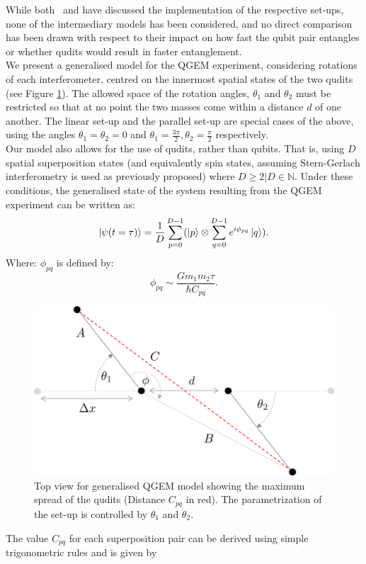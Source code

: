 \documentclass[%
 12pt,
 superscriptaddress,
 amsmath,
 amssymb,
 onecolumn,
 longbibliography
]{revtex4-2}
\begin{document}
\indent While both~\cite{Bose2017} and \cite{Nguyen2019} have discussed the implementation of the respective set-ups, none of the intermediary models has been considered, and no direct comparison has been drawn with respect to their impact on how fast the qubit pair entangles or whether qudits would result in faster entanglement. \\
\indent We present a generalised model for the QGEM experiment, considering rotations of each interferometer, centred on the innermost spatial states of the two qudits (see Figure \ref{fig:generalised set-up}). The allowed space of the rotation angles, $\theta_1$ and $\theta_2$ must be restricted so that at no point the two masses come within a distance $d$ of one another. The linear set-up and the parallel set-up are special cases of the above, using the angles $\theta_1=\theta_2=0$ and $\theta_1 = \frac{3\pi}{2}, \theta_2 = \frac{\pi}{2}$ respectively. \\
\indent Our model also allows for the use of qudits, rather than qubits. That is, using $D$ spatial superposition states (and equivalently spin states, assuming Stern-Gerlach interferometry is used as previously proposed) where $D\ge2|D\in\mathbb{N}$. Under these conditions, the generalised state of the system resulting from the QGEM experiment can be written as:
		\begin{equation}
			\Ket{\psi(t = \tau)}=\frac{1}{D}\sum_{p = 0}^{D - 1}(\Ket{p}\otimes\sum_{q = 0}^{D - 1} e^{i\phi_{pq}} \Ket{q}).
		\end{equation}
Where: $\phi_{pq}$ is defined by:
		\begin{equation}
			\phi_{pq}\sim\frac{Gm_1m_2\tau}{\hbar C_{pq}}.
		\end{equation}
	\begin{figure}
	\centering
	    \par\medskip
		\includegraphics[width=0.5\columnwidth]{general_5.png}\par\medskip
		\caption{Top view for generalised QGEM model showing the maximum spread of the qudits (Distance $C_{pq}$ in red). The parametrization of the set-up is controlled by $\theta_1$ and $\theta_2$. \label{fig:generalised set-up}}
	\end{figure}
\indent The value $C_{pq}$ for each superposition pair can be derived using simple trigonometric rules and is given by
\end{document}
